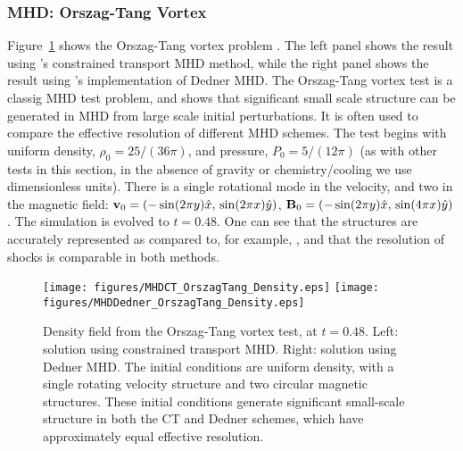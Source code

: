 \subsubsection{MHD: Orszag-Tang Vortex}
\label{sec.tests.mhd}

Figure~\ref{fig.orszag} shows the Orszag-Tang vortex problem
\citep{Orszag79}.  The left panel shows the result using \enzo's
constrained transport MHD method, while the right panel shows the
result using \enzo's implementation of Dedner MHD.  The Orszag-Tang
vortex test is a classig MHD test problem, and shows that significant
small scale structure can be generated in MHD from large scale initial
perturbations.  It is often used to compare the effective resolution
of different MHD schemes.  The test begins with uniform density,
$\rho_0=25/(36\pi)$, and pressure, $P_0=5/(12\pi)$ (as with other
tests in this section, in the absence of gravity or chemistry/cooling
we use dimensionless units).  There is a single rotational mode in the
velocity, and two in the magnetic field: ${\bf v}_0 = (-\sin(2\pi y)
\hat{x},\, \sin(2\pi x) \hat{y})$, ${\bf B}_0 = (-\sin(2\pi y)
\hat{x},\, \sin(4\pi x) \hat{y})$.  The simulation is evolved to
$t=0.48$.  One can see that the structures are accurately represented
as compared to, for example, \citet{Toth00}, and that the resolution
of shocks is comparable in both methods.

\begin{figure}
\begin{center}
\texttt{[image: figures/MHDCT\_OrszagTang\_Density.eps]}
\texttt{[image: figures/MHDDedner\_OrszagTang\_Density.eps]}
\caption{Density field from the Orszag-Tang vortex test, at $t=0.48$.
Left: solution using constrained transport MHD.  Right: solution using
Dedner MHD. The initial conditions are uniform density, with a single
rotating velocity structure and two circular magnetic structures.
These initial conditions generate significant small-scale structure in
both the CT and Dedner schemes, which have approximately equal
effective resolution.}
\label{fig.orszag}
\end{center}
\end{figure}
